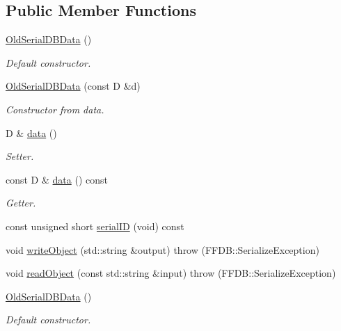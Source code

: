\subsection*{Public Member Functions}
\begin{DoxyCompactItemize}
\item 
\mbox{\hyperlink{classADATIO_1_1OldSerialDBData_a189c0c4ac35db492b9cbc68deb15c5dd}{Old\+Serial\+D\+B\+Data}} ()
\begin{DoxyCompactList}\small\item\em Default constructor. \end{DoxyCompactList}\item 
\mbox{\hyperlink{classADATIO_1_1OldSerialDBData_ada293b92b5081fbb6e82364196ff5524}{Old\+Serial\+D\+B\+Data}} (const D \&d)
\begin{DoxyCompactList}\small\item\em Constructor from data. \end{DoxyCompactList}\item 
D \& \mbox{\hyperlink{classADATIO_1_1OldSerialDBData_ad917fd5898616290b7c0d30cb878850f}{data}} ()
\begin{DoxyCompactList}\small\item\em Setter. \end{DoxyCompactList}\item 
const D \& \mbox{\hyperlink{classADATIO_1_1OldSerialDBData_a4d5c8f72f1f572f26127f728b202e345}{data}} () const
\begin{DoxyCompactList}\small\item\em Getter. \end{DoxyCompactList}\item 
const unsigned short \mbox{\hyperlink{classADATIO_1_1OldSerialDBData_a379c8edee426f2a5ce3f41d0c46777de}{serial\+ID}} (void) const
\item 
void \mbox{\hyperlink{classADATIO_1_1OldSerialDBData_aec52af4bfb6beb74fc039b9b25328270}{write\+Object}} (std\+::string \&output)  throw (\+F\+F\+D\+B\+::\+Serialize\+Exception)
\item 
void \mbox{\hyperlink{classADATIO_1_1OldSerialDBData_aad0338cd19224fe3eb6223afe7e2c2c4}{read\+Object}} (const std\+::string \&input)  throw (\+F\+F\+D\+B\+::\+Serialize\+Exception)
\item 
\mbox{\hyperlink{classADATIO_1_1OldSerialDBData_a189c0c4ac35db492b9cbc68deb15c5dd}{Old\+Serial\+D\+B\+Data}} ()
\begin{DoxyCompactList}\small\item\em Default constructor. \end{DoxyCompactList}\item 

\end{DoxyCompactItemize}
